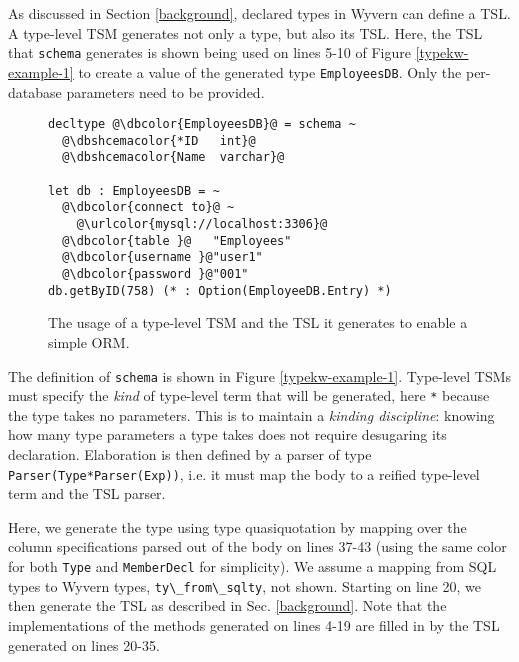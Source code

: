 \documentclass{sig-alternate}[10pt]
\newcommand{\urlcolor}[1]{\textcolor[HTML]{FFCC33}{#1}}
\newcommand{\dbcolor}[1]{\textcolor[HTML]{2F276F}{#1}}
\newcommand{\dbshcemacolor}[1]{\textcolor[HTML]{5AC3D1}{#1}}
\newcommand{\mycaption}[1]{\vspace{-10px}\caption{#1}\vspace{-8px}}
\newcommand{\lstinlinew}[1]{\lstinline[style=wyvern]{#1}}
\begin{document}
As discussed in Section \ref{background}, declared types in Wyvern can define a TSL. A type-level TSM   generates not only a type, but also its TSL. Here, the TSL that \lstinlinew{schema} generates is shown being used on lines 5-10 of Figure \ref{typekw-example-1} to create a value of the generated type \lstinlinew{EmployeesDB}. Only the per-database parameters need to be provided. %

\begin{figure}[t]
\begin{lstlisting}[style=wyvern]
decltype @\dbcolor{EmployeesDB}@ = schema ~
  @\dbshcemacolor{*ID   int}@
  @\dbshcemacolor{Name  varchar}@

let db : EmployeesDB = ~
  @\dbcolor{connect to}@ ~
    @\urlcolor{mysql://localhost:3306}@
  @\dbcolor{table }@   "Employees"
  @\dbcolor{username }@"user1"
  @\dbcolor{password }@"001"
db.getByID(758) (* : Option(EmployeeDB.Entry) *)
\end{lstlisting}
\mycaption{The usage of a type-level TSM and the TSL it generates to enable a simple ORM.}
\label{f-tykwexample}
\end{figure}
  

The definition of \lstinlinew{schema} is shown in Figure \ref{typekw-example-1}. Type-level TSMs must specify the \emph{kind} of type-level term that will be generated, here \lstinlinew{*} because the type takes no parameters. This is to maintain a \emph{kinding discipline}: knowing how many type parameters a type takes does not require desugaring its declaration. Elaboration is then defined by a parser of type \lstinlinew{Parser(Type*Parser(Exp))}, i.e. it must map the body to a reified type-level term and the TSL parser. 

Here, we generate the type using type quasiquotation by mapping over the column specifications parsed out of the body on lines 37-43 (using the same color for both \lstinlinew{Type} and \lstinlinew{MemberDecl} for simplicity). We assume a mapping from SQL types to Wyvern types, \lstinlinew{ty\_from\_sqlty}, not shown. Starting on line 20, we then generate the TSL as described in Sec. \ref{background}. Note  that the implementations of the methods generated on lines 4-19 are filled in by the TSL generated on lines 20-35.
\end{document}
